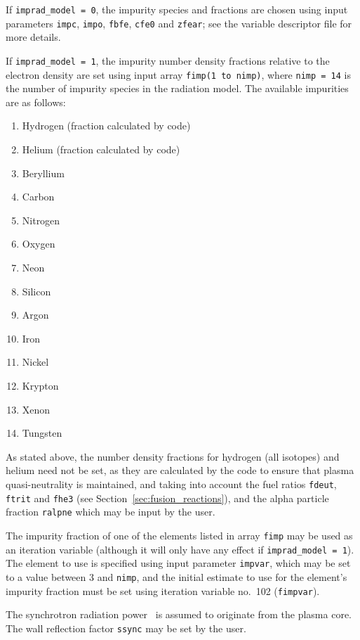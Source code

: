 \documentclass[11pt,a4paper]{report}
\begin{document}
If \texttt{imprad\_model = 0}, the impurity species and fractions are chosen
using input parameters \texttt{impc}, \texttt{impo}, \texttt{fbfe},
\texttt{cfe0} and \texttt{zfear}; see the variable descriptor file for more
details.

If \texttt{imprad\_model = 1}, the impurity number density fractions relative
to the electron density are set using input array \texttt{fimp(1 to nimp)},
where \texttt{nimp = 14} is the number of impurity species in the radiation
model. The available impurities are as follows:
\begin{enumerate}
\item Hydrogen (fraction calculated by code)
\item Helium (fraction calculated by code)
\item Beryllium
\item Carbon
\item Nitrogen
\item Oxygen
\item Neon
\item Silicon
\item Argon
\item Iron
\item Nickel
\item Krypton
\item Xenon
\item Tungsten
\end{enumerate}
As stated above, the number density fractions for hydrogen (all isotopes) and
helium need not be set, as they are calculated by the code to ensure that
plasma quasi-neutrality is maintained, and taking into account the fuel ratios
\texttt{fdeut}, \texttt{ftrit} and \texttt{fhe3} (see
Section~\ref{sec:fusion_reactions}), and the alpha particle fraction
\texttt{ralpne} which may be input by the user.

The impurity fraction of one of the elements listed in array \texttt{fimp} may
be used as an iteration variable (although it will only have any effect if
\texttt{imprad\_model = 1}). The element to use is specified using input
parameter \texttt{impvar}, which may be set to a value between 3 and
\texttt{nimp}, and the initial estimate to use for the element's impurity
fraction must be set using iteration variable no.\ 102 (\texttt{fimpvar}).

The synchrotron radiation power~\cite{albajar, fidone} is assumed to originate
from the plasma core. The wall reflection factor \texttt{ssync} may be set by
the user.
\end{document}
